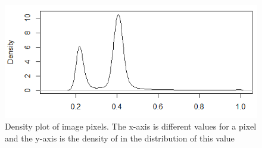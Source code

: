 \begin{figure}
\centering
\includegraphics[width=\linewidth]{Images/Distribution}
\caption{Density plot of image pixels. The x-axis is different values for a pixel and the y-axis is the density of in the distribution of this value}
\label{fig:pixeldistribution}
\end{figure}